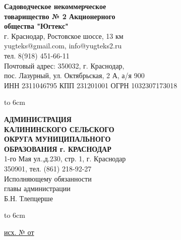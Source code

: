 \noindent\parbox[l][71mm]{80mm}
{
	 \begin{center}
 {\small \textbf{Садоводческое некоммерческое\\ товарищество
 	№  2 Акционерного\\ общества "Югтекс"\\
 }}
 \footnotesize{г. Краснодар, Ростовское шоссе, 13 км\\
 	yugteks@gmail.com, info@yugteks2.ru\\
 	тел. 8(918) 451-66-11\\
 	Почтовый адрес: 350032, г. Краснодар,\\ пос. Лазурный, ул. Октябрьская, 2 А, а/я   900
  }\\
 {ИНН 2311046795 КПП 231201001 ОГРН 1032307173018}
		\end{center}
\hbox to 6cm{ }}\hfill
\parbox[l][71mm]{65mm}
{ \begin{center}
  {\small \textbf{АДМИНИСТРАЦИЯ\\ КАЛИНИНСКОГО
 		СЕЛЬСКОГО\\ ОКРУГА МУНИЦИПАЛЬНОГО\\
 		ОБРАЗОВАНИЯ г. КРАСНОДАР\\
 }}
 \footnotesize{1-го Мая ул.,д.230, стр. 1, г. Краснодар\\
 350901, тел. (861) 218-92-27\\
 {\normalsize  	 Исполняющему обязанности\\
 	главы администрации\\}
 	 {\normalsize 	Б.Н. Тлепцерше}
 }\\
 \end{center}
\hbox to 6cm{ }}
\linebreak
\vspace{-12mm}

\underline{исх. №  от } 